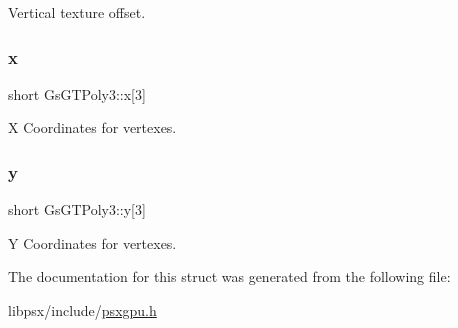 Vertical texture offset. 

\mbox{\label{structGsGTPoly3_ae3714403a39ee1e80b370b998ec83b29}} 
\subsubsection{\texorpdfstring{x}{x}}
{\footnotesize\ttfamily short Gs\+G\+T\+Poly3\+::x\mbox{[}3\mbox{]}}



X Coordinates for vertexes. 

\mbox{\label{structGsGTPoly3_ab314ec9af8c175188d644ff048df69d1}} 
\subsubsection{\texorpdfstring{y}{y}}
{\footnotesize\ttfamily short Gs\+G\+T\+Poly3\+::y\mbox{[}3\mbox{]}}



Y Coordinates for vertexes. 



The documentation for this struct was generated from the following file\+:\begin{DoxyCompactItemize}
\item 
libpsx/include/\hyperlink{psxgpu_8h}{psxgpu.\+h}\end{DoxyCompactItemize}
